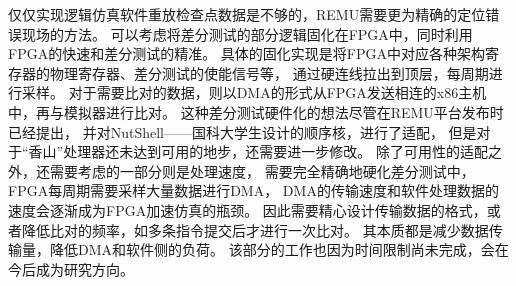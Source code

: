 仅仅实现逻辑仿真软件重放检查点数据是不够的，REMU需要更为精确的定位错误现场的方法。
可以考虑将差分测试的部分逻辑固化在FPGA中，同时利用FPGA的快速和差分测试的精准。
具体的固化实现是将FPGA中对应各种架构寄存器的物理寄存器、差分测试的使能信号等，
通过硬连线拉出到顶层，每周期进行采样。
对于需要比对的数据，则以DMA的形式从FPGA发送相连的x86主机中，再与模拟器进行比对。
这种差分测试硬件化的想法尽管在REMU平台发布时已经提出，
并对NutShell——国科大学生设计的顺序核，进行了适配，
但是对于“香山”处理器还未达到可用的地步，还需要进一步修改。
除了可用性的适配之外，还需要考虑的一部分则是处理速度，
需要完全精确地硬化差分测试中，FPGA每周期需要采样大量数据进行DMA，
DMA的传输速度和软件处理数据的速度会逐渐成为FPGA加速仿真的瓶颈。
因此需要精心设计传输数据的格式，或者降低比对的频率，如多条指令提交后才进行一次比对。
其本质都是减少数据传输量，降低DMA和软件侧的负荷。
该部分的工作也因为时间限制尚未完成，会在今后成为研究方向。